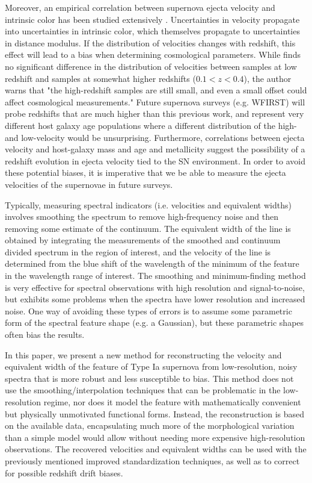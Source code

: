 Moreover, an empirical correlation between supernova ejecta velocity and intrinsic color has been studied extensively \citep{wang_improved_2009, foley_measuring_2011, foley_velocity_2011,foley_relation_2012,mandel_type_2014}. Uncertainties in velocity propagate into uncertainties in intrinsic color, which themselves propagate to uncertainties in distance modulus. If the distribution of velocities changes with redshift, this effect will lead to a bias when determining cosmological parameters. While \citet{foley_relation_2012} finds no significant difference in the distribution of velocities between samples at low redshift and samples at somewhat higher redshifts ($ 0.1 <  z  < 0.4$), the author warns that "the high-redshift samples are still small, and even a small offset could affect cosmological measurements."  Future supernova surveys (e.g. WFIRST) will probe redshifts that are much higher than this previous work, and represent very different host galaxy age populations where a different distribution of the high- and low-velocity would be unsurprising.  Furthermore, correlations between ejecta velocity and host-galaxy mass \citep{foley_relation_2012} and age and metallicity \citep{wang_evidence_2013} suggest the possibility of a redshift evolution in ejecta velocity tied to the SN environment. In order to avoid these potential biases, it is imperative that we be able to measure the ejecta velocities of the supernovae in future surveys.

Typically, measuring spectral indicators (i.e. velocities and equivalent widths) involves smoothing the spectrum to remove high-frequency noise and then removing some estimate of the continuum. The equivalent width of the line is obtained by integrating the measurements of the smoothed and continuum divided spectrum in the region of interest, and the velocity of the line is determined from the blue shift of the wavelength of the minimum of the feature in the wavelength range of interest. The smoothing and minimum-finding method is very effective for spectral observations with high resolution and signal-to-noise, but exhibits some problems when the spectra have lower resolution and increased noise. One way of avoiding these types of errors is to assume some parametric form of the spectral feature shape (e.g. a Gaussian), but these parametric shapes often bias the results.

In this paper, we present a new method for reconstructing the velocity and equivalent width of the \siliconii\; feature of Type Ia supernova from low-resolution, noisy spectra that is more robust and less susceptible to bias. This method does not use the smoothing/interpolation techniques that can be problematic in the low-resolution regime, nor does it model the feature with mathematically convenient but physically unmotivated functional forms. Instead, the reconstruction is based on the available data, encapsulating much more of the morphological variation than a simple model would allow without needing more expensive high-resolution observations. The recovered velocities and equivalent widths can be used with the previously mentioned improved standardization techniques, as well as to correct for possible redshift drift biases.

